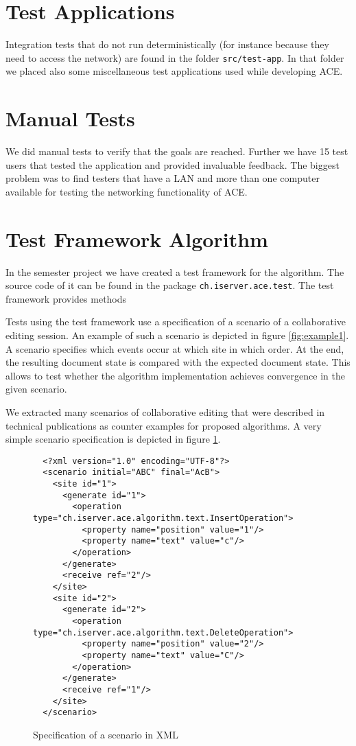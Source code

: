 \section{Test Applications}
Integration tests that do not run deterministically (for instance
because they need to access the network) are found in the folder
\texttt{src/test-app}. In that folder we placed also some miscellaneous
test applications used while developing ACE.




\section{Manual Tests}
We did manual tests to verify that the goals are reached. Further we have
15 test users that tested the application and provided invaluable
feedback. The biggest problem was to find testers that have a LAN and
more than one computer available for testing the networking functionality
of ACE.



\section{Test Framework Algorithm}
In the semester project we have created a test framework for the algorithm.
The source code of it can be found in the package
\texttt{ch.iserver.ace.test}. The test framework provides methods

Tests using the test framework use a specification of a scenario
of a collaborative editing session. An example of such a scenario is
depicted in figure \ref{fig:example1}. A scenario specifies which 
events occur at
which site in which order. At the end, the resulting document state is
compared with the expected document state. This allows to test whether
the algorithm implementation achieves convergence in the given scenario.

We extracted many scenarios of collaborative editing that were described
in technical publications as counter examples for proposed algorithms. A very
simple scenario specification is depicted in figure \ref{fig:testing.scenario}.

\begin{figure}[H]
 \small{\begin{verbatim}
  <?xml version="1.0" encoding="UTF-8"?>
  <scenario initial="ABC" final="AcB">      
    <site id="1">
      <generate id="1">
        <operation type="ch.iserver.ace.algorithm.text.InsertOperation">
          <property name="position" value="1"/>
          <property name="text" value="c"/>
        </operation>
      </generate>
      <receive ref="2"/>
    </site>
    <site id="2">
      <generate id="2">
        <operation type="ch.iserver.ace.algorithm.text.DeleteOperation">
          <property name="position" value="2"/>
          <property name="text" value="C"/>
        </operation>
      </generate>
      <receive ref="1"/>
    </site>
  </scenario>
 \end{verbatim}}
 \caption{Specification of a scenario in XML}
 \label{fig:testing.scenario}
\end{figure}

